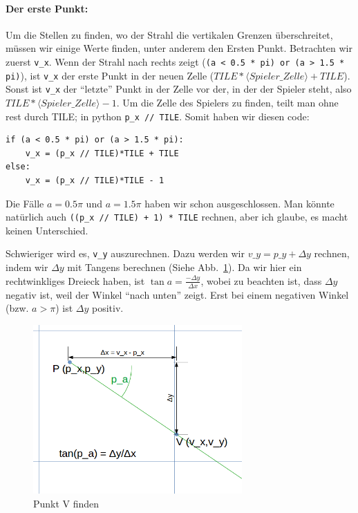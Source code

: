 \documentclass[a4paper,12pt]{report}
\begin{document}
\paragraph{Der erste Punkt:}
Um die Stellen zu finden, wo der Strahl die vertikalen Grenzen \"uberschreitet, m\"ussen wir einige Werte finden, unter anderem den Ersten Punkt. Betrachten wir zuerst \texttt{v\_x}. Wenn der Strahl nach rechts zeigt (\texttt{(a < 0.5 * pi) or (a > 1.5 * pi)}), ist \texttt{v\_x} der erste Punkt in der neuen Zelle ($TILE*\langle Spieler\_Zelle\rangle + TILE$). Sonst ist \texttt{v\_x} der ``letzte'' Punkt in der Zelle vor der, in der der Spieler steht, also $TILE*\langle Spieler\_Zelle\rangle - 1$. Um die Zelle des Spielers zu finden, teilt man ohne rest durch TILE; in python \texttt{p\_x // TILE}. Somit haben wir diesen code:
\begin{Verbatim}[baselinestretch=1.0, xleftmargin=1cm]
if (a < 0.5 * pi) or (a > 1.5 * pi):
	v_x = (p_x // TILE)*TILE + TILE
else:
	v_x = (p_x // TILE)*TILE - 1
\end{Verbatim}

Die F\"alle $a = 0.5\pi$ und $a = 1.5\pi$ haben wir schon ausgeschlossen. Man k\"onnte nat\"urlich auch \texttt{((p\_x // TILE) + 1) * TILE} rechnen, aber ich glaube, es macht keinen Unterschied.

Schwieriger wird es, \texttt{v\_y} auszurechnen. Dazu werden wir $v\_y = p\_y + \Delta y$ rechnen, indem wir $\Delta y$ mit Tangens berechnen (Siehe Abb.~\ref{fig:vcheck1}). Da wir hier ein rechtwinkliges Dreieck haben, ist $\tan a = \frac{-\Delta y}{\Delta x}$, wobei zu beachten ist, dass $\Delta y$ negativ ist, weil der Winkel ``nach unten'' zeigt.
Erst bei einem negativen Winkel (bzw. $a > \pi$) ist $\Delta y$ positiv.

\begin{figure}[htbp] 
        \centering
        \includegraphics[width=8cm]{vcheck1.png} 
        \caption{Punkt V finden}
        \label{fig:vcheck1}
\end{figure}
\end{document}
